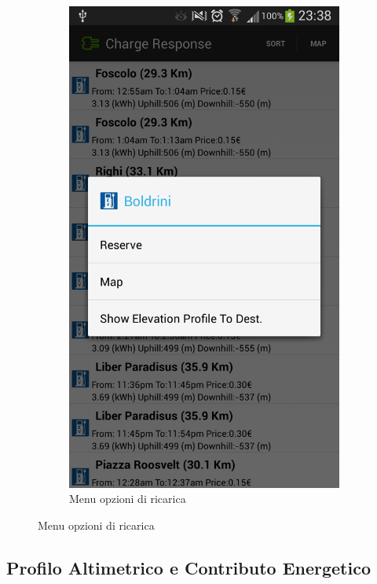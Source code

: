 \begin{figure}
\begin{subfigure}{0.45\textwidth}
		\includegraphics[width=\textwidth]{assets/mobile-app-charge-options-menu.png}
		\caption{Menu opzioni di ricarica}
		\label{fig:charge-options-menu}
    \end{subfigure}
\end{figure}

\subsection{Profilo Altimetrico e Contributo Energetico}\label{subsec:altimetry}

